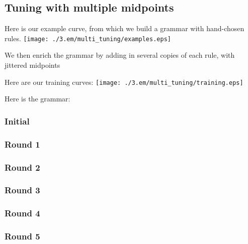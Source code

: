 
\subsection{Tuning with multiple midpoints}

Here is our example curve, from which we build a grammar with hand-chosen rules.
\texttt{[image: ./3.em/multi\_tuning/examples.eps]}

We then enrich the grammar by adding in several copies of each rule,
with jittered midpoints

Here are our training curves:
\texttt{[image: ./3.em/multi\_tuning/training.eps]}

Here is the grammar:

\subsubsection{Initial}


\subsubsection{Round 1}

\subsubsection{Round 2}

\subsubsection{Round 3}

\subsubsection{Round 4}

\subsubsection{Round 5}


